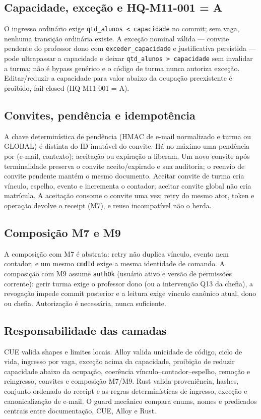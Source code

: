 \subsection*{Capacidade, exceção e HQ-M11-001 = A}
O ingresso ordinário exige \texttt{qtd\_alunos < capacidade} no commit; sem
vaga, nenhuma transição ordinária existe. A exceção nominal válida — convite
pendente do professor dono com \texttt{exceder\_capacidade} e justificativa
persistida — pode ultrapassar a capacidade e deixar \texttt{qtd\_alunos >
capacidade} sem invalidar a turma; não é bypass genérico e o código de turma
nunca autoriza exceção. Editar/reduzir a capacidade para valor abaixo da
ocupação preexistente é proibido, fail-closed (HQ-M11-001 = A).

\subsection*{Convites, pendência e idempotência}
A chave determinística de pendência (HMAC de e-mail normalizado e turma ou
GLOBAL) é distinta do ID imutável do convite. Há no máximo uma pendência por
(e-mail, contexto); aceitação ou expiração a liberam. Um novo convite após
terminalidade preserva o convite aceito/expirado e sua auditoria; o reenvio de
convite pendente mantém o mesmo documento. Aceitar convite de turma cria
vínculo, espelho, evento e incrementa o contador; aceitar convite global não
cria matrícula. A aceitação consome o convite uma vez; retry do mesmo ator,
token e operação devolve o receipt (M7), e reuso incompatível não o herda.

\subsection*{Composição M7 e M9}
A composição com M7 é abstrata: retry não duplica vínculo, evento nem contador,
e um mesmo \texttt{cmdId} exige a mesma identidade de comando. A composição com
M9 assume \texttt{authOk} (usuário ativo e versão de permissões corrente):
gerir turma exige o professor dono (ou a intervenção Q13 da chefia), a revogação
impede commit posterior e a leitura exige vínculo canônico atual, dono ou
chefia. Autorização é necessária, nunca suficiente.

\subsection*{Responsabilidade das camadas}
CUE valida shapes e limites locais. Alloy valida unicidade de código, ciclo de
vida, ingresso por vaga, exceção acima da capacidade, proibição de reduzir
capacidade abaixo da ocupação, coerência vínculo--contador--espelho, remoção e
reingresso, convites e composição M7/M9. Rust valida proveniência, hashes,
conjunto ordenado do receipt e as regras determinísticas de ingresso, exceção e
canonicalização de e-mail. O guard mecânico compara enums, nomes e predicados
centrais entre documentação, CUE, Alloy e Rust.

